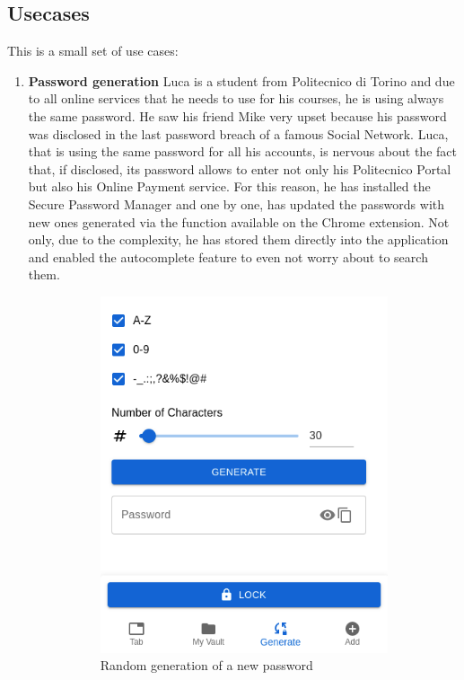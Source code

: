 \subsection{Usecases}
This is a small set of use cases:
\begin{enumerate}
	\item \textbf{Password generation}
	Luca is a student from Politecnico di Torino and due to all online services that he needs to use for his courses, he is using always the same password. He saw his friend Mike very upset because his password was disclosed in the last password breach of a famous Social Network. Luca, that is using the same password for all his accounts, is nervous about the fact that, if disclosed, its password allows to enter not only his Politecnico Portal but also his Online Payment service.\newline
	For this reason, he has installed the Secure Password Manager and one by one, has updated the passwords with new ones generated via the function available on the Chrome extension. Not only, due to the complexity, he has stored them directly into the application and enabled the autocomplete feature to even not worry about to search them.
	\begin{figure}[H]
		\centering
		\begin{subfigure}{.5\textwidth}
			\centering
			\includegraphics[width=.6\linewidth]{images/extension/generate.png}
			\caption{Random generation of a new password}
			\label{fig:sub1}
		\end{subfigure}%
		\begin{subfigure}{.5\textwidth}
			\centering

\end{subfigure}
\end{figure}
\end{enumerate}
